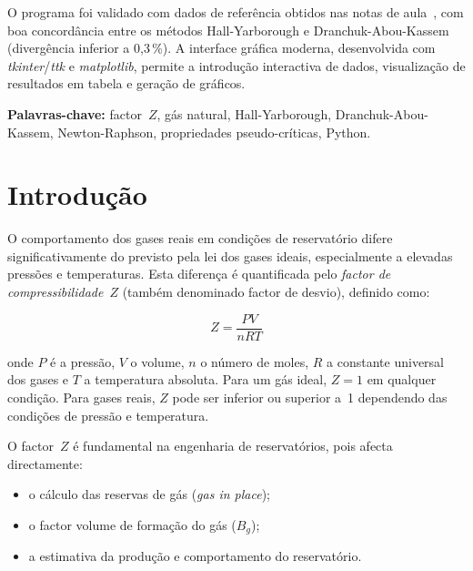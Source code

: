 \documentclass[12pt,a4paper]{article}
\begin{document}
O programa foi validado com dados de referência obtidos nas notas de aula~\cite{Ramos2020}, com
boa concordância entre os métodos Hall-Yarborough e Dranchuk-Abou-Kassem
(divergência inferior a 0{,}3\,\%). A interface gráfica moderna, desenvolvida
com \textit{tkinter}/\textit{ttk} e \textit{matplotlib}, permite a introdução
interactiva de dados, visualização de resultados em tabela e geração de gráficos.

\medskip
\noindent\textbf{Palavras-chave:} factor~$Z$, gás natural, Hall-Yarborough,
Dranchuk-Abou-Kassem, Newton-Raphson, propriedades pseudo-críticas, Python.

\newpage

\tableofcontents
\newpage
{}
\setcounter{page}{1}

\section{Introdução}

O comportamento dos gases reais em condições de reservatório difere
significativamente do previsto pela lei dos gases ideais, especialmente a
elevadas pressões e temperaturas. Esta diferença é quantificada pelo
\emph{factor de compressibilidade}~$Z$ (também denominado factor de desvio),
definido como:

\begin{equation}
  Z = \frac{PV}{nRT}
  \label{eq:z_def}
\end{equation}

\noindent onde $P$ é a pressão, $V$ o volume, $n$ o número de moles, $R$ a
constante universal dos gases e $T$ a temperatura absoluta. Para um gás ideal,
$Z=1$ em qualquer condição. Para gases reais, $Z$ pode ser inferior ou superior
a~1 dependendo das condições de pressão e temperatura.

O factor~$Z$ é fundamental na engenharia de reservatórios, pois afecta
directamente:
\begin{itemize}[noitemsep]
  \item o cálculo das reservas de gás (\emph{gas in place});
  \item o factor volume de formação do gás ($B_g$);
  \item a estimativa da produção e comportamento do reservatório.
\end{itemize}
\end{document}
